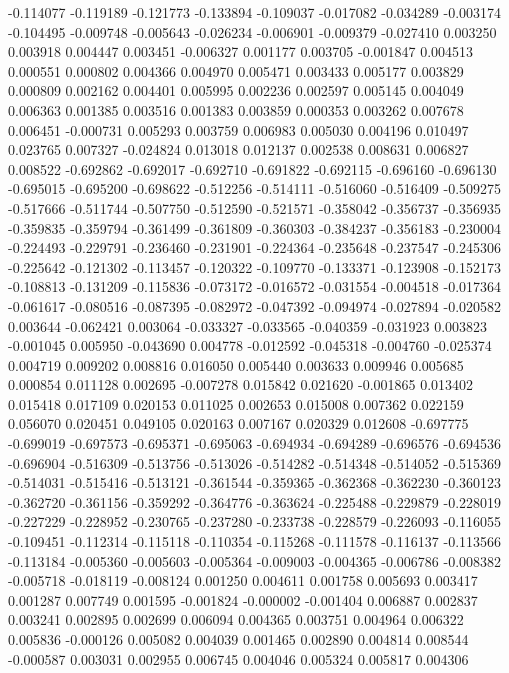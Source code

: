 -0.114077
-0.119189
-0.121773
-0.133894
-0.109037
-0.017082
-0.034289
-0.003174
-0.104495
-0.009748
-0.005643
-0.026234
-0.006901
-0.009379
-0.027410
0.003250
0.003918
0.004447
0.003451
-0.006327
0.001177
0.003705
-0.001847
0.004513
0.000551
0.000802
0.004366
0.004970
0.005471
0.003433
0.005177
0.003829
0.000809
0.002162
0.004401
0.005995
0.002236
0.002597
0.005145
0.004049
0.006363
0.001385
0.003516
0.001383
0.003859
0.000353
0.003262
0.007678
0.006451
-0.000731
0.005293
0.003759
0.006983
0.005030
0.004196
0.010497
0.023765
0.007327
-0.024824
0.013018
0.012137
0.002538
0.008631
0.006827
0.008522
-0.692862
-0.692017
-0.692710
-0.691822
-0.692115
-0.696160
-0.696130
-0.695015
-0.695200
-0.698622
-0.512256
-0.514111
-0.516060
-0.516409
-0.509275
-0.517666
-0.511744
-0.507750
-0.512590
-0.521571
-0.358042
-0.356737
-0.356935
-0.359835
-0.359794
-0.361499
-0.361809
-0.360303
-0.384237
-0.356183
-0.230004
-0.224493
-0.229791
-0.236460
-0.231901
-0.224364
-0.235648
-0.237547
-0.245306
-0.225642
-0.121302
-0.113457
-0.120322
-0.109770
-0.133371
-0.123908
-0.152173
-0.108813
-0.131209
-0.115836
-0.073172
-0.016572
-0.031554
-0.004518
-0.017364
-0.061617
-0.080516
-0.087395
-0.082972
-0.047392
-0.094974
-0.027894
-0.020582
0.003644
-0.062421
0.003064
-0.033327
-0.033565
-0.040359
-0.031923
0.003823
-0.001045
0.005950
-0.043690
0.004778
-0.012592
-0.045318
-0.004760
-0.025374
0.004719
0.009202
0.008816
0.016050
0.005440
0.003633
0.009946
0.005685
0.000854
0.011128
0.002695
-0.007278
0.015842
0.021620
-0.001865
0.013402
0.015418
0.017109
0.020153
0.011025
0.002653
0.015008
0.007362
0.022159
0.056070
0.020451
0.049105
0.020163
0.007167
0.020329
0.012608
-0.697775
-0.699019
-0.697573
-0.695371
-0.695063
-0.694934
-0.694289
-0.696576
-0.694536
-0.696904
-0.516309
-0.513756
-0.513026
-0.514282
-0.514348
-0.514052
-0.515369
-0.514031
-0.515416
-0.513121
-0.361544
-0.359365
-0.362368
-0.362230
-0.360123
-0.362720
-0.361156
-0.359292
-0.364776
-0.363624
-0.225488
-0.229879
-0.228019
-0.227229
-0.228952
-0.230765
-0.237280
-0.233738
-0.228579
-0.226093
-0.116055
-0.109451
-0.112314
-0.115118
-0.110354
-0.115268
-0.111578
-0.116137
-0.113566
-0.113184
-0.005360
-0.005603
-0.005364
-0.009003
-0.004365
-0.006786
-0.008382
-0.005718
-0.018119
-0.008124
0.001250
0.004611
0.001758
0.005693
0.003417
0.001287
0.007749
0.001595
-0.001824
-0.000002
-0.001404
0.006887
0.002837
0.003241
0.002895
0.002699
0.006094
0.004365
0.003751
0.004964
0.006322
0.005836
-0.000126
0.005082
0.004039
0.001465
0.002890
0.004814
0.008544
-0.000587
0.003031
0.002955
0.006745
0.004046
0.005324
0.005817
0.004306
